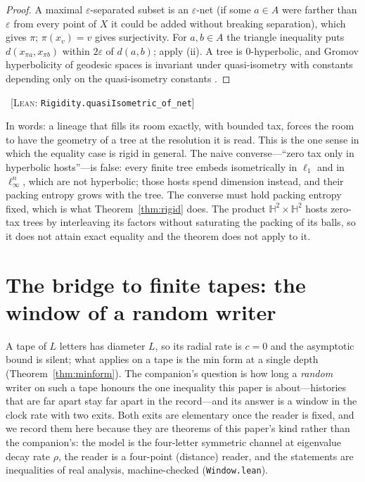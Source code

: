 \documentclass[11pt,reqno]{amsart}
\theoremstyle{plain}
\theoremstyle{definition}
\newcommand{\Htwo}{\mathbb{H}^2}
\newcommand{\eps}{\varepsilon}
\newcommand{\cert}[1]{{\footnotesize\ [\textsc{Lean}: \texttt{#1}]}}
\begin{document}
\begin{proof}
A maximal $\eps$-separated subset is an $\eps$-net (if some $a\in A$ were farther than $\eps$ from every point of $X$ it could be added without breaking separation), which gives $\pi$; $\pi(x_v)=v$ gives surjectivity. For $a,b\in A$ the triangle inequality puts $d(x_{\pi a},x_{\pi b})$ within $2\eps$ of $d(a,b)$; apply (ii). A tree is $0$-hyperbolic, and Gromov hyperbolicity of geodesic spaces is invariant under quasi-isometry with constants depending only on the quasi-isometry constants \cite{gromov1987}.
\end{proof}\cert{Rigidity.quasiIsometric\_of\_net}

In words: a lineage that fills its room exactly, with bounded tax, forces the room to have the geometry of a tree at the resolution it is read. This is the one sense in which the equality case is rigid in general. The naive converse---``zero tax only in hyperbolic hosts''---is false: every finite tree embeds isometrically in $\ell_1$ and in $\ell_\infty^n$, which are not hyperbolic; those hosts spend dimension instead, and their packing entropy grows with the tree. The converse must hold packing entropy fixed, which is what Theorem~\ref{thm:rigid} does. The product $\Htwo\times\Htwo$ hosts zero-tax trees by interleaving its factors without saturating the packing of its balls, so it does not attain exact equality and the theorem does not apply to it.

\section{The bridge to finite tapes: the window of a random writer}\label{sec:window}

A tape of $L$ letters has diameter $L$, so its radial rate is $c=0$ and the asymptotic bound is silent; what applies on a tape is the min form at a single depth (Theorem~\ref{thm:minform}). The companion's question is how long a \emph{random} writer on such a tape honours the one inequality this paper is about---histories that are far apart stay far apart in the record---and its answer is a window in the clock rate with two exits. Both exits are elementary once the reader is fixed, and we record them here because they are theorems of this paper's kind rather than the companion's: the model is the four-letter symmetric channel at eigenvalue decay rate $\rho$, the reader is a four-point (distance) reader, and the statements are inequalities of real analysis, machine-checked (\texttt{Window.lean}).
\end{document}
